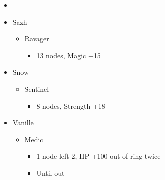 \begin{menu}
\begin{itemize}
    \paradigm
    \begin{itemize}
        \item {}%
{\paradigmline{(\com)}{(\com)}{(\med)}}%
{\paradigmline{(\rav)}{\rav}{\rav}}%
{\paradigmline[3]{\textit{\rav}}{\textit{(\rav)}}{\textit{(\sab)}}}%
{\paradigmline{\com}{\com}{\rav}}%
{\paradigmline{(\syn)}{(\rav)}{\sab}}%
{\paradigmline{\com}{\com}{\rav}}
    \end{itemize}
    \crystarium
    \begin{itemize}
        \item Sazh
        \begin{itemize}
            \item Ravager
            \begin{itemize}
                \item 13 nodes, Magic +15
            \end{itemize}
        \end{itemize}
        \item Snow
        \begin{itemize}
            \item Sentinel
            \begin{itemize}
                \item 8 nodes, Strength +18
            \end{itemize}
        \end{itemize}
        \item Vanille
        \begin{itemize}
            \item Medic
            \begin{itemize}
                \item 1 node left 2, HP +100 out of ring twice
                \item Until out
            \end{itemize}
        \end{itemize}
    \end{itemize}
\end{itemize}
\end{menu}


